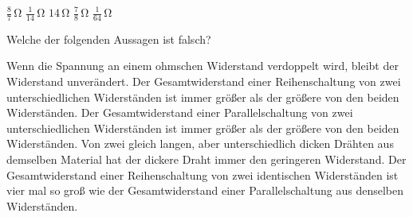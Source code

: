 \documentclass[11pt]{exam}
\begin{document}
\begin{questions}
\begin{choices}
	\choice \(\mathrm{\frac{8}{7}\,\Omega}\)
	\choice \(\mathrm{\frac{1}{14}\,\Omega}\)
	\choice \(\mathrm{14\,\Omega}\)
	\choice \(\mathrm{\frac{7}{8}\,\Omega}\)
	\choice \(\mathrm{\frac{1}{64}\,\Omega}\)
\end{choices}

\vspace{3mm}\question Welche der folgenden Aussagen ist falsch?

\begin{choices}
	\choice Wenn die Spannung an einem ohmschen Widerstand verdoppelt wird, bleibt der Widerstand unverändert.
	\choice Der Gesamtwiderstand einer Reihenschaltung von zwei unterschiedlichen Widerständen ist immer größer als der größere von den beiden Widerständen.
	\choice Der Gesamtwiderstand einer Parallelschaltung von zwei unterschiedlichen Widerständen ist immer größer als der größere von den beiden Widerständen.
	\choice Von zwei gleich langen, aber unterschiedlich dicken Drähten aus demselben Material hat der dickere Draht immer den geringeren Widerstand.
	\choice Der Gesamtwiderstand einer Reihenschaltung von zwei identischen Widerständen ist vier mal so groß wie der Gesamtwiderstand einer Parallelschaltung aus denselben Widerständen.
\end{choices}

\vspace{3mm}\end{questions}
\end{document}
